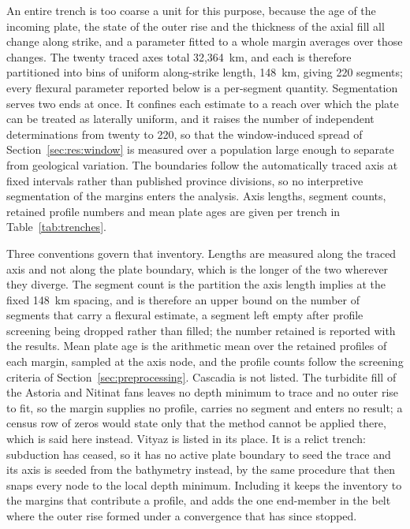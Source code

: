 \documentclass[final]{agujournal2019}
\begin{document}
An entire trench is too coarse a unit for this purpose, because the age of the
incoming plate, the state of the outer rise and the thickness of the axial fill
all change along strike, and a parameter fitted to a whole margin averages over
those changes. The twenty traced axes total 32,364~km, and each is therefore
partitioned into bins of uniform along-strike length, 148~km, giving 220
segments; every flexural parameter reported below is a per-segment quantity.
Segmentation serves two ends at once. It confines each estimate to a reach over
which the plate can be treated as laterally uniform, and it raises the number of
independent determinations from twenty to 220, so that the window-induced spread
of Section~\ref{sec:res:window} is measured over a population large enough to
separate from geological variation. The boundaries follow the automatically
traced axis at fixed intervals rather than published province divisions, so no
interpretive segmentation of the margins enters the analysis. Axis lengths,
segment counts, retained profile numbers and mean plate ages are given per
trench in Table~\ref{tab:trenches}.

Three conventions govern that inventory. Lengths are measured along the traced
axis and not along the plate boundary, which is the longer of the two wherever
they diverge. The segment count is the partition the axis length implies at the
fixed 148~km spacing, and is therefore an upper bound on the number of segments
that carry a flexural estimate, a segment left empty after profile screening
being dropped rather than filled; the number retained is reported with
the results. Mean plate age is the arithmetic mean over the retained profiles of
each margin, sampled at the axis node, and the profile counts follow the
screening criteria of Section~\ref{sec:preprocessing}. Cascadia is not listed.
The turbidite fill of the Astoria and Nitinat fans leaves no depth minimum to
trace and no outer rise to fit, so the margin supplies no profile, carries no
segment and enters no result; a census row of zeros would state only that the
method cannot be applied there, which is said here instead. Vityaz is listed
in its place. It is a relict trench: subduction has ceased, so it has no active
plate boundary to seed the trace and its axis is seeded from the bathymetry
instead, by the same procedure that then snaps every node to the local depth
minimum. Including it keeps the inventory to the margins that contribute a
profile, and adds the one end-member in the belt where the outer rise formed
under a convergence that has since stopped.
\end{document}
